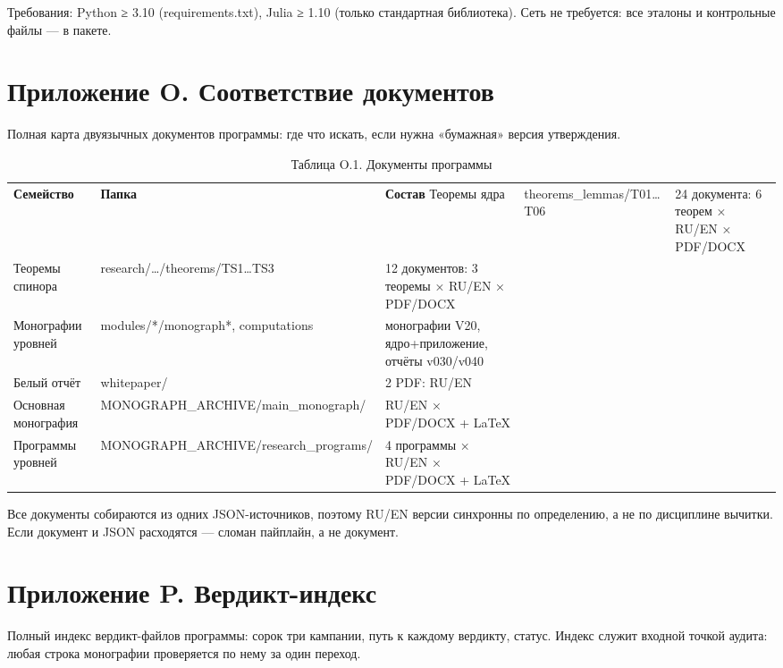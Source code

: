 \documentclass[11pt,a4paper]{article}
\begin{document}
Требования: Python ≥ 3.10 (requirements.txt), Julia ≥ 1.10 (только стандартная библиотека). Сеть не требуется: все эталоны и контрольные файлы — в пакете.

\section{Приложение O. Соответствие документов}

Полная карта двуязычных документов программы: где что искать, если нужна «бумажная» версия утверждения.

\begin{table}[htbp]\centering\small
\caption{Таблица O.1. Документы программы}
\begin{tabular}{p{} p{} p{}}
\toprule
\textbf{Семейство} & \textbf{Папка} & \textbf{Состав}
\midrule
Теоремы ядра & theorems\_lemmas/T01…T06 & 24 документа: 6 теорем × RU/EN × PDF/DOCX \\
Теоремы спинора & research/…/theorems/TS1…TS3 & 12 документов: 3 теоремы × RU/EN × PDF/DOCX \\
Монографии уровней & modules/*/monograph*, computations & монографии V20, ядро+приложение, отчёты v030/v040 \\
Белый отчёт & whitepaper/ & 2 PDF: RU/EN \\
Основная монография & MONOGRAPH\_ARCHIVE/main\_monograph/ & RU/EN × PDF/DOCX + LaTeX \\
Программы уровней & MONOGRAPH\_ARCHIVE/research\_programs/ & 4 программы × RU/EN × PDF/DOCX + LaTeX \\
\bottomrule
\end{tabular}
\end{table}

Все документы собираются из одних JSON-источников, поэтому RU/EN версии синхронны по определению, а не по дисциплине вычитки. Если документ и JSON расходятся — сломан пайплайн, а не документ.

\section{Приложение P. Вердикт-индекс}

Полный индекс вердикт-файлов программы: сорок три кампании, путь к каждому вердикту, статус. Индекс служит входной точкой аудита: любая строка монографии проверяется по нему за один переход.
\end{document}
